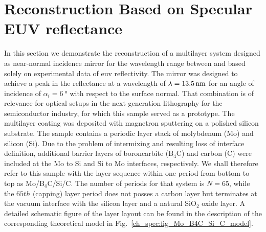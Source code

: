 \section{Reconstruction Based on Specular EUV reflectance} \label{ch_spec:sec_PTB17}

In this section we demonstrate the reconstruction of a multilayer system designed as near-normal incidence mirror for the wavelength range between  and  based solely on experimental data of \gls{euv} reflectivity. The mirror was designed to achieve a peak in the reflectance at a wavelength of $\lambda=\nm{13.5}$ for an angle of incidence of $\alpha_i = \SI{6}{\degree}$ with respect to the surface normal. That combination is of relevance for optical setups in the next generation lithography for the semiconductor industry, for which this sample served as a prototype. The multilayer coating was deposited with magnetron sputtering on a polished silicon substrate. The sample contains a periodic layer stack of molybdenum (Mo) and silicon (Si). Due to the problem of intermixing and resulting loss of interface definition, additional barrier layers of boroncarbite (B$_4$C) and carbon (C) were included at the Mo to Si and Si to Mo interfaces, respectively. We shall therefore refer to this sample with the layer sequence within one period from bottom to top as Mo/B$_4$C/Si/C. The number of periods for that system is $N=65$, while the $65th$ (capping) layer period does not posses a carbon layer but terminates at the vacuum interface with the silicon layer and a natural SiO$_2$ oxide layer. A detailed schematic figure of the layer layout can be found in the description of the corresponding theoretical model in Fig.~\ref{ch_spec:fig_Mo_B4C_Si_C_model}.

